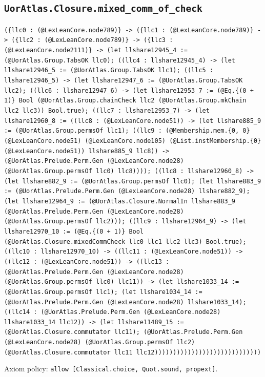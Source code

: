 \documentclass[11pt]{article}
\begin{document}
\subsection*{\texttt{UorAtlas.Closure.mixed\_comm\_of\_check}}
\noindent\texttt{(\{llc0 : (@LexLeanCore.node789)\} -> (\{llc1 : (@LexLeanCore.node789)\} -> (\{llc2 : (@LexLeanCore.node789)\} -> (\{llc3 : (@LexLeanCore.node2111)\} -> (let llshare12945\_4 := (@UorAtlas.Group.TabsOK llc0); ((llc4 : llshare12945\_4) -> (let llshare12946\_5 := (@UorAtlas.Group.TabsOK llc1); ((llc5 : llshare12946\_5) -> (let llshare12947\_6 := (@UorAtlas.Group.TabsOK llc2); ((llc6 : llshare12947\_6) -> (let llshare12953\_7 := (@Eq.\{(0 + 1)\} Bool (@UorAtlas.Group.chainCheck llc2 (@UorAtlas.Group.mkChain llc2 llc3)) Bool.true); ((llc7 : llshare12953\_7) -> (let llshare12960\_8 := ((llc8 : (@LexLeanCore.node51)) -> (let llshare885\_9 := (@UorAtlas.Group.permsOf llc1); ((llc9 : (@Membership.mem.\{0, 0\} (@LexLeanCore.node51) (@LexLeanCore.node105) (@List.instMembership.\{0\} (@LexLeanCore.node51)) llshare885\_9 llc8)) -> (@UorAtlas.Prelude.Perm.Gen (@LexLeanCore.node28) (@UorAtlas.Group.permsOf llc0) llc8)))); ((llc8 : llshare12960\_8) -> (let llshare882\_9 := (@UorAtlas.Group.permsOf llc0); (let llshare883\_9 := (@UorAtlas.Prelude.Perm.Gen (@LexLeanCore.node28) llshare882\_9); (let llshare12964\_9 := (@UorAtlas.Closure.NormalIn llshare883\_9 (@UorAtlas.Prelude.Perm.Gen (@LexLeanCore.node28) (@UorAtlas.Group.permsOf llc2))); ((llc9 : llshare12964\_9) -> (let llshare12970\_10 := (@Eq.\{(0 + 1)\} Bool (@UorAtlas.Closure.mixedCommCheck llc0 llc1 llc2 llc3) Bool.true); ((llc10 : llshare12970\_10) -> ((llc11 : (@LexLeanCore.node51)) -> ((llc12 : (@LexLeanCore.node51)) -> ((llc13 : (@UorAtlas.Prelude.Perm.Gen (@LexLeanCore.node28) (@UorAtlas.Group.permsOf llc0) llc11)) -> (let llshare1033\_14 := (@UorAtlas.Group.permsOf llc1); (let llshare1034\_14 := (@UorAtlas.Prelude.Perm.Gen (@LexLeanCore.node28) llshare1033\_14); ((llc14 : (@UorAtlas.Prelude.Perm.Gen (@LexLeanCore.node28) llshare1033\_14 llc12)) -> (let llshare11489\_15 := (@UorAtlas.Closure.commutator llc11); (@UorAtlas.Prelude.Perm.Gen (@LexLeanCore.node28) (@UorAtlas.Group.permsOf llc2) (@UorAtlas.Closure.commutator llc11 llc12)))))))))))))))))))))))))))))}\par
\noindent Axiom policy: \texttt{allow [Classical.choice, Quot.sound, propext]}.\par
\end{document}
